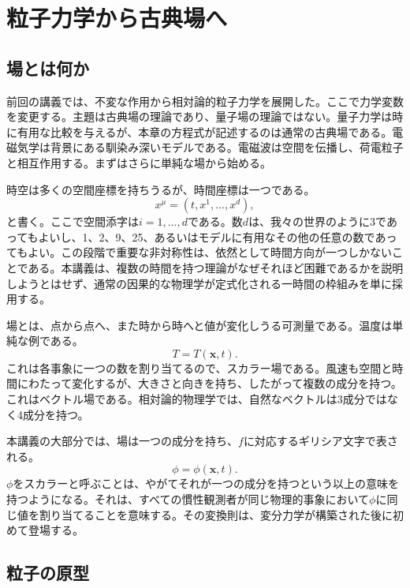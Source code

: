 \chapter{粒子力学から古典場へ}

\section{場とは何か}

前回の講義では、不変な作用から相対論的粒子力学を展開した。ここで力学変数を変更する。主題は古典場の理論であり、量子場の理論ではない。量子力学は時に有用な比較を与えるが、本章の方程式が記述するのは通常の古典場である。電磁気学は背景にある馴染み深いモデルである。電磁波は空間を伝播し、荷電粒子と相互作用する。まずはさらに単純な場から始める。

時空は多くの空間座標を持ちうるが、時間座標は一つである。
\begin{equation}
x^\mu=(t,x^1,\ldots,x^d),
\end{equation}
と書く。ここで空間添字は\(i=1,\ldots,d\)である。数\(d\)は、我々の世界のように3であってもよいし、1、2、9、25、あるいはモデルに有用なその他の任意の数であってもよい。この段階で重要な非対称性は、依然として時間方向が一つしかないことである。本講義は、複数の時間を持つ理論がなぜそれほど困難であるかを説明しようとはせず、通常の因果的な物理学が定式化される一時間の枠組みを単に採用する。

場とは、点から点へ、また時から時へと値が変化しうる可測量である。温度は単純な例である。
\begin{equation}
T=T(\mathbf{x},t).
\end{equation}
これは各事象に一つの数を割り当てるので、スカラー場である。風速も空間と時間にわたって変化するが、大きさと向きを持ち、したがって複数の成分を持つ。これはベクトル場である。相対論的物理学では、自然なベクトルは3成分ではなく4成分を持つ。

本講義の大部分では、場は一つの成分を持ち、\(f\)に対応するギリシア文字で表される。
\begin{equation}
\phi=\phi(\mathbf{x},t).
\label{eq:sr4-field-definition}
\end{equation}
\(\phi\)をスカラーと呼ぶことは、やがてそれが一つの成分を持つという以上の意味を持つようになる。それは、すべての慣性観測者が同じ物理的事象において\(\phi\)に同じ値を割り当てることを意味する。その変換則は、変分力学が構築された後に初めて登場する。

\section{粒子の原型}

